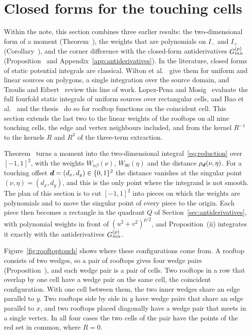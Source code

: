 \section{Closed forms for the touching cells}
\label{sec:touching}

Within the note, this section combines three earlier results: the
two-dimensional form of a moment (Theorem~), the weights that are polynomials on $I_-$ and $I_+$
(Corollary~), and the corner difference with the closed-form antiderivatives $G^{(p)}_{mn}$
(Proposition~ and Appendix~\ref{app:antiderivatives}). In the literature, closed forms of static
potential integrals are classical. Wilton et al.~\cite{wilton1984potential} give them for uniform and linear sources on
polygons, a single integration over the source domain, and Tzoulis and Eibert~\cite{Tzoulis2004} review this line of
work. Lopez-Pena and Mosig~\cite{lopezpena2009analytical} evaluate the full fourfold static integrals of uniform sources
over rectangular cells, and Bao et al.~\cite{Bao2020} and the thesis~\cite{machacek2025method} do so for rooftop
functions on the coincident cell. This section extends the last two to the linear weights of the rooftops on all nine
touching cells, the edge and vertex neighbours included, and from the kernel $R^{-1}$ to the kernels $R$ and $R^3$ of
the three-term extraction.

Theorem~ turns a moment into the two-dimensional integral~\eqref{eq:reduction} over $[-1,1]^2$,
with the weights $W_{\alpha\beta}(\nu)$, $W_{00}(\eta)$ and the distance $\rho_{\vb*{d}}(\nu,\eta)$. For a touching offset
$\vb*{d}=(d_x,d_y)\in\{0,1\}^2$ the distance vanishes at the singular point $(\nu,\eta)=(d_x,d_y)$, and this is the only
point where the integrand is not smooth. The plan of this section is to cut $[-1,1]^2$ into pieces on which the weights
are polynomials and to move the singular point of every piece to the origin. Each piece then becomes a rectangle in the
quadrant $Q$ of Section~\ref{sec:antiderivatives}, with polynomial weights in front of $(u^2+v^2)^{p/2}$, and
Proposition~(ii) integrates it exactly with the antiderivatives $G^{(p)}_{mn}$.

Figure~\ref{fig:rooftoptouch} shows where these configurations come from. A rooftop consists of two wedges, so a pair
of rooftops gives four wedge pairs (Proposition~), and each wedge pair is a pair of cells. Two
rooftops in a row that overlap by one cell have a wedge pair on the same cell, the coincident configuration. With one
cell between them, the two inner wedges share an edge parallel to $y$. Two rooftops side by side in $y$ have wedge
pairs that share an edge parallel to $x$, and two rooftops placed diagonally have a wedge pair that meets in a single
vertex. In all four cases the two cells of the pair have the points of the red set in common, where $R=0$.

